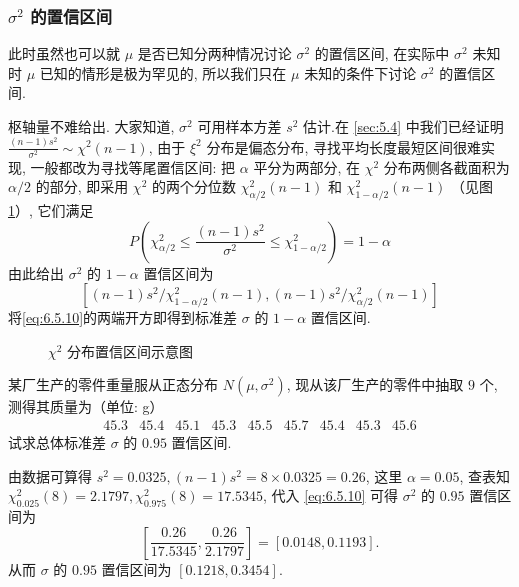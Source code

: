 \subsubsection{$\sigma^2$ 的置信区间}\label{sssec:6.5.3.3}

此时虽然也可以就 $\mu$ 是否已知分两种情况讨论 $\sigma^2$ 的置信区间, 在实际中 $\sigma^2$ 未知时 $\mu$ 已知的情形是极为罕见的, 所以我们只在 $\mu$ 未知的条件下讨论 $\sigma^2$ 的置信区间.

枢轴量不难给出. 大家知道, $\sigma^2$ 可用样本方差 $s^2$ 估计.在 \ref{sec:5.4} 中我们已经证明 $\frac{(n-1) s^{2}}{\sigma^{2}} \sim \chi^{2}(n-1)$, 由于 $\xi^2$ 分布是偏态分布, 寻找平均长度最短区间很难实现, 一般都改为寻找等尾置信区间: 把 $\alpha$ 平分为两部分, 在 $\chi^2$ 分布两侧各截面积为 $\alpha/2$ 的部分, 即采用 $\chi^2$ 的两个分位数 $\chi_{\alpha/ 2}^{2}(n-1)$ 和 $\chi_{1-\alpha / 2}^{2}(n-1)$ （见图 \ref{fig:6.5.4}）, 它们满足
\[P\left(\chi_{\alpha/ 2}^{2} \leqslant \frac{(n-1) s^{2}}{\sigma^{2}} \leqslant \chi_{1-\alpha / 2}^{2}\right)=1-\alpha\]
由此给出 $\sigma^2$ 的 $1-\alpha$ 置信区间为
\begin{equation}\label{eq:6.5.10}
\left[(n-1) s^{2} / \chi_{1-\alpha / 2}^{2}(n-1),(n-1) s^{2} / \chi_{\alpha / 2}^{2}(n-1)\right]
\end{equation}
将\eqref{eq:6.5.10}的两端开方即得到标准差 $\sigma$ 的 $1-\alpha$ 置信区间.
\begin{figure}[htbp]
\centering
{}
\caption{$\chi^2$ 分布置信区间示意图}
\label{fig:6.5.4}	
\end{figure}

\begin{example}\label{exam:6.5.6}
某厂生产的零件重量服从正态分布 $N(\mu,\sigma^2)$, 现从该厂生产的零件中抽取 $9$ 个, 测得其质量为（单位: g）
\[\begin{array}{ccccccccc}
45.3&45.4&45.1&45.3&45.5&45.7&45.4&45.3&45.6
\end{array}\]
试求总体标准差 $\sigma$ 的 $0.95$ 置信区间.
\end{example}\begin{solution}
由数据可算得 $s^{2}=0.0325,(n-1) s^{2}=8 \times 0.0325=0.26$, 这里 $\alpha=0.05$,  查表知 $\chi_{0.025}^{2}(8)=2.1797, \chi_{0.975}^{2}(8)=17.5345$, 代入 \eqref{eq:6.5.10} 可得 $\sigma^2$ 的 $0.95$ 置信区间为
\[\left[\frac{0.26}{17.5345}, \frac{0.26}{2.1797}\right]=[0.0148,0.1193].\]
从而 $\sigma$ 的 $0.95$ 置信区间为 $[0.1218,0.3454]$.
\end{solution}

